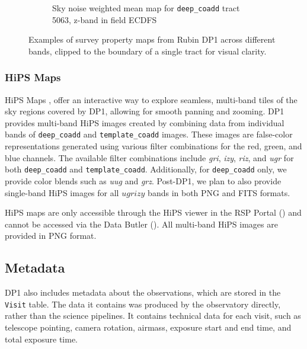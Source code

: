 \begin{figure}[hbt!]
\begin{subfigure}[t]{0.31\textwidth}
  \caption{Sky noise weighted mean map for \texttt{deep\_coadd} \gls{tract} 5063, z-band in field ECDFS}
  \end{subfigure}\hfill
\caption{Examples of survey property maps from Rubin \gls{DP1} across different bands, clipped to the boundary of a single \gls{tract} for visual clarity.}
  \label{fig:survey_property_maps}
\end{figure}

\subsubsection{HiPS Maps}
\gls{HiPS} Maps \citep{2015A&A...578A.114F}, offer an interactive way to explore seamless, multi-band tiles of the sky regions covered by \gls{DP1}, allowing for smooth panning and zooming.
\gls{DP1} provides multi-band \gls{HiPS} images created by combining data from individual bands of \texttt{deep\_coadd} and \texttt{template\_coadd} images.
These images are false-color representations generated using various filter combinations for the red, green, and blue channels.
The available filter combinations include \textit{gri}, \textit{izy}, \textit{riz}, and \textit{ugr} for both \texttt{deep\_coadd} and \texttt{template\_coadd}.
Additionally, for \texttt{deep\_coadd} only, we provide color blends such as \textit{uug} and \textit{grz}.
Post-\gls{DP1}, we plan to also provide single-band HiPS images for all $ugrizy$ bands in both \gls{PNG} and \gls{FITS} formats.

\gls{HiPS} maps are only accessible through the \gls{HiPS} viewer in the \gls{RSP} Portal () and cannot be accessed via the Data \gls{Butler} ().
All multi-band \gls{HiPS} images are provided in \gls{PNG} format.

\subsection{Metadata
\label{ssec:metadata}}

\gls{DP1} also includes \gls{metadata} about the observations, which are stored in the \texttt{Visit} table. The data it contains was produced by the observatory directly, rather than the science pipelines.
It contains technical data for each visit, such as telescope pointing, \gls{camera} rotation, \gls{airmass}, exposure start and end time, and total exposure time.

